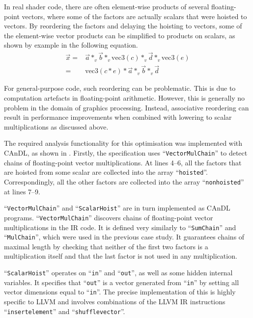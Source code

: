     In real shader code, there are often element-wise products of several
    floating-point vectors, where some of the factors are actually scalars
    that were hoisted to vectors.
    By reordering the factors and delaying the hoisting to vectors, some of the
    element-wise vector products can be simplified to products on scalars, as
    shown by example in the following equation.
    \begin{align*}
        \vec x={}&\vec a*_v\vec b*_v\text{vec3}(c)*_v\vec d*_v\text{vec3}(e)\\
        ={}&\text{vec3}(c*e)*\vec a*_v\vec b*_v\vec d
    \end{align*}

    For general-purpose code, such reordering can be problematic.
    This is due to computation artefacts in floating-point arithmetic.
    However, this is generally no problem in the domain of graphics processing.
    Instead, associative reordering can result in performance improvements
    when combined with lowering to scalar multiplications as discussed above.

    The required analysis functionality for this optimisation was implemented
    with CAnDL, as shown in .
    Firstly, the specification uses ``\texttt{VectorMulChain}'' to detect 
    chains of floating-point vector multiplications.
    At lines 4--6, all the factors that are hoisted from some scalar are
    collected into the array ``{\tt hoisted}''.
    Correspondingly, all the other factors are collected into the array
    ``{\tt nonhoisted}'' at lines 7--9.

    ``{\tt VectorMulChain}'' and ``{\tt ScalarHoist}'' are in turn implemented
    as CAnDL programs.
    ``{\tt VectorMulChain}'' discovers chains of floating-point vector
    multiplications in the IR code.
    It is defined very similarly to ``{\tt SumChain}'' and ``{\tt MulChain}'',
    which were used in the previous case study.
    It guarantees chains of maximal length by checking that neither of the first
    two factors is a multiplication itself and that the last factor is not used
    in any multiplication.

    ``\texttt{ScalarHoist}'' operates on ``{\tt in}'' and ``{\tt out}'', as well
    as some hidden internal variables.
    It specifies that ``{\tt out}'' is a vector generated from ``{\tt in}'' by
    setting all vector dimensions equal to ``{\tt in}''.
    The precise implementation of this is highly specific to LLVM and involves
    combinations of the LLVM IR instructions ``{\tt insertelement}'' and
    ``{\tt shufflevector}''.

